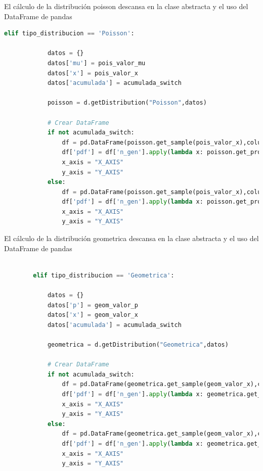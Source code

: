 \documentclass[
	12pt, %
]{fphw}
\begin{document}
\newpage
El cálculo de la distribución poisson descansa en la clase abstracta y el uso del DataFrame de pandas

\begin{lstlisting}[language=Python,caption=Distribucion Binomial]
        elif tipo_distribucion == 'Poisson':

            datos = {}
            datos['mu'] = pois_valor_mu
            datos['x'] = pois_valor_x
            datos['acumulada'] = acumulada_switch

            poisson = d.getDistribution("Poisson",datos)

            # Crear DataFrame                                                                              
            if not acumulada_switch:
                df = pd.DataFrame(poisson.get_sample(pois_valor_x),columns=['n_gen'])
                df['pdf'] = df['n_gen'].apply(lambda x: poisson.get_probability(x))
                x_axis = "X_AXIS"
                y_axis = "Y_AXIS"
            else:
                df = pd.DataFrame(poisson.get_sample(pois_valor_x),columns=['n_gen'])
                df['pdf'] = df['n_gen'].apply(lambda x: poisson.get_probability_cdf(x))
                x_axis = "X_AXIS"
                y_axis = "Y_AXIS"

\end{lstlisting}
\newpage
El cálculo de la distribución geometrica descansa en la clase abstracta y el uso del DataFrame de pandas

\begin{lstlisting}[language=Python,caption=Distribucion Geometrica]

        elif tipo_distribucion == 'Geometrica':

            datos = {}
            datos['p'] = geom_valor_p
            datos['x'] = geom_valor_x
            datos['acumulada'] = acumulada_switch

            geometrica = d.getDistribution("Geometrica",datos)

            # Crear DataFrame                                                                              
            if not acumulada_switch:
                df = pd.DataFrame(geometrica.get_sample(geom_valor_x),columns=['n_gen'])
                df['pdf'] = df['n_gen'].apply(lambda x: geometrica.get_probability(x))
                x_axis = "X_AXIS"
                y_axis = "Y_AXIS"
            else:
                df = pd.DataFrame(geometrica.get_sample(geom_valor_x),columns=['n_gen'])
                df['pdf'] = df['n_gen'].apply(lambda x: geometrica.get_probability_cdf(x))
                x_axis = "X_AXIS"
                y_axis = "Y_AXIS"
\end{lstlisting}
\end{document}
